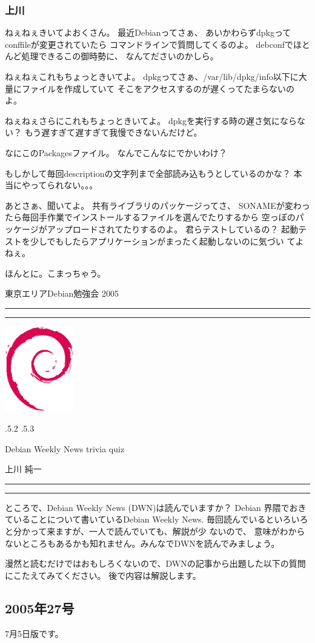 \documentclass[mingoth]{jsarticle}
\makeatletter
\renewcommand{\section}{\@startsection{section}{1}{\z@}%
    {\Cvs \@plus.5\Cdp \@minus.2\Cdp}%
    {.5\Cvs \@plus.3\Cdp}%
    {\normalfont\Large\headfont\raggedright\centering}} %
\newcommand{\dancersection}[2]{%
\newpage
東京エリアDebian勉強会 2005
\hrule
\vspace{0.5mm}
\hrule
\hfill{}\includegraphics[width=3cm]{image200502/openlogo-nd.eps}\\
\vspace{-4cm}
\begin{center}
  \section{#1}
\end{center}
\hfill{}#2\hspace{3cm}\space\\
\hrule
\hrule
\vspace{1cm}
}
\makeatother
\begin{document}
\subsubsection{上川}

ねぇねぇきいてよおくさん。
最近Debianってさぁ、
あいかわらずdpkgってconffileが変更されていたら
コマンドラインで質問してくるのよ。
debconfでほとんど処理できるこの御時勢に、
なんてださいのかしら。

ねぇねぇこれもちょっときいてよ。
dpkgってさぁ、/var/lib/dpkg/info以下に大量にファイルを作成していて
そこをアクセスするのが遅くってたまらないのよ。

ねぇねぇさらにこれもちょっときいてよ。
dpkgを実行する時の遅さ気にならない？
もう遅すぎて遅すぎて我慢できないんだけど。

なにこのPackagesファイル。
なんでこんなにでかいわけ？

もしかして毎回descriptionの文字列まで全部読み込もうとしているのかな？
本当にやってられない。。。

あとさぁ、聞いてよ。
共有ライブラリのパッケージってさ、
SONAMEが変わったら毎回手作業でインストールするファイルを選んでたりするから
空っぽのパッケージがアップロードされてたりするのよ。
君らテストしているの？
起動テストを少しでもしたらアプリケーションがまったく起動しないのに気づい
てよねぇ。

ほんとに。こまっちゃう。

\dancersection{Debian Weekly News trivia quiz}{上川 純一}

ところで、Debian Weekly News (DWN)は読んでいますか？
Debian 界隈でおきていることについて書いているDebian Weekly News.
毎回読んでいるといろいろと分かって来ますが、一人で読んでいても、解説が少
ないので、
意味がわからないところもあるかも知れません。みんなでDWNを読んでみましょう。

漫然と読むだけではおもしろくないので、DWNの記事から出題した以下の質問にこたえてみてください。
後で内容は解説します。

\subsection{2005年27号}
7月5日版です。
\end{document}
